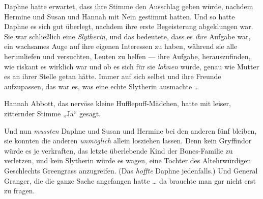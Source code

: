 Daphne hatte erwartet, dass ihre Stimme den Ausschlag geben würde, nachdem Hermine und Susan und Hannah mit Nein gestimmt hatten. Und so hatte Daphne es sich gut überlegt, nachdem ihre erste Begeisterung abgeklungen war. Sie war schließlich eine \emph{Slytherin}, und das bedeutete, dass es \emph{ihre} Aufgabe war, ein wachsames Auge auf ihre eigenen Interessen zu haben, während sie alle herumliefen und versuchten, Leuten zu helfen — ihre Aufgabe, herauszufinden, wie riskant es wirklich war und ob es sich für sie \emph{lohnen} würde, genau wie Mutter es an ihrer Stelle getan hätte. Immer auf sich selbst und ihre Freunde aufzupassen, das war es, was eine echte Slytherin ausmachte …

Hannah Abbott, das nervöse kleine Hufflepuff-Mädchen, hatte mit leiser, zitternder Stimme
„Ja“ gesagt.

Und nun \emph{mussten} Daphne und Susan und Hermine bei den anderen fünf bleiben, sie konnten die anderen \emph{unmöglich} allein losziehen lassen. Denn kein Gryffindor würde es je verkraften, das letzte überlebende Kind der Bones-Familie zu verletzen, und kein Slytherin würde es wagen, eine Tochter des Altehrwürdigen Geschlechts Greengrass anzugreifen. (Das \emph{hoffte} Daphne jedenfalls.) Und General Granger, die die ganze Sache angefangen hatte … da brauchte man gar nicht erst zu fragen.

